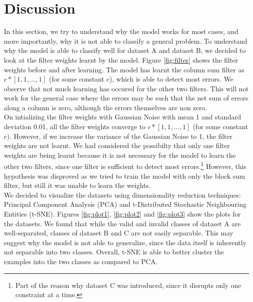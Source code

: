 \documentclass[twoside]{article}
\begin{document}
\section{Discussion}
In this section, we try to understand why the model works for most cases, and more importantly, why it is not able to classify a general problem. To understand why the model is able to classify well for dataset A and dataset B, we decided to look at the filter weights learnt by the model. Figure \ref{fig:filter} shows the filter weights before and after learning. The model has learnt the column sum filter as $c*[1, 1, ..., 1]$ (for some constant c), which is able to detect most errors. We observe that not much learning has occured for the other two filters. This will not work for the general case where the errors may be such that the net sum of errors along a column is zero, although the errors themselves are non zero. \\
On intializing the filter weights with Gaussian Noise with mean 1 and standard deviation 0.01, all the filter weights converge to $c*[1, 1, ..., 1]$ (for some constant c). However, if we increase the variance of the Gaussian Noise to 1, the filter weights are not learnt.
We had considered the possibilty that only one filter weights are being learnt because it is not necessary for the model to learn the other two filters, since one filter is sufficient to detect most errors.\footnote{Part of the reason why dataset C was introduced, since it disrupts only one constraint at a time.} However, this hypothesis was disproved as we tried to train the model with only the block sum filter, but still it was unable to learn the weights.\\
We decided to visualize the datasets using dimensionality reduction techniques: Principal Component Analysis (PCA) and t-Distributed Stochastic Neighbouring Entities (t-SNE). Figures \ref{fig:plot1}, \ref{fig:plot2} and \ref{fig:plot3} show the plots for the datasets. We found that while the valid and invalid classes of dataset A are well-separated, classes of dataset B and C are not easily separable. This may suggest why the model is not able to generalize, since the data itself is inherently not separable into two classes. Overall, t-SNE is able to better cluster the examples into the two classes as compared to PCA.
\end{document}
